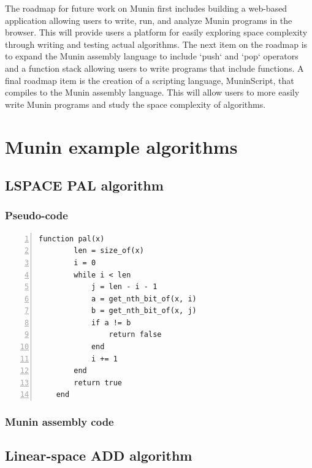 \documentclass[11pt, a4paper]{article}
\begin{document}
The roadmap for future work on Munin first includes building a web-based application allowing users to write, run, and analyze Munin programs in the browser.
This will provide users a platform for easily exploring space complexity through writing and testing actual algorithms.
The next item on the roadmap is to expand the Munin assembly language to include `push` and `pop` operators and a function stack allowing users to write programs that include functions.
A final roadmap item is the creation of a scripting language, MuninScript, that compiles to the Munin assembly language.
This will allow users to more easily write Munin programs and study the space complexity of algorithms.

\newpage

\onecolumn

\appendix

\section{Munin example algorithms}

\subsection{LSPACE PAL algorithm}\label{app:pal}

\subsubsection{Pseudo-code}

\begin{lstlisting}[numbers=left]
    function pal(x)
        len = size_of(x)
        i = 0
        while i < len
            j = len - i - 1
            a = get_nth_bit_of(x, i)
            b = get_nth_bit_of(x, j)
            if a != b
                return false
            end
            i += 1
        end
        return true
    end
\end{lstlisting}

\subsubsection{Munin assembly code}



\subsection{Linear-space ADD algorithm}\label{app:linAdd}
\end{document}
